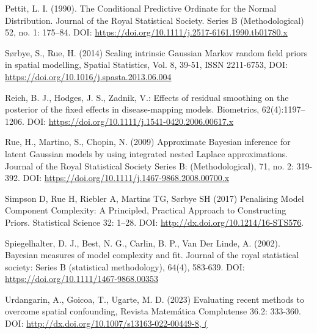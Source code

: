 \documentclass{article}
\begin{document}
\begin{thebibliography}{99}
Pettit, L. I. (1990). The Conditional Predictive Ordinate for the Normal Distribution. Journal of the Royal Statistical Society. Series B (Methodological) 52, no. 1: 175–84. DOI: \url{https://doi.org/10.1111/j.2517-6161.1990.tb01780.x}

Sørbye, S., Rue, H. (2014) Scaling intrinsic Gaussian Markov random field priors in spatial modelling, Spatial Statistics, Vol. 8, 39-51, ISSN 2211-6753, DOI: \url{https://doi.org/10.1016/j.spasta.2013.06.004}

Reich, B. J., Hodges, J. S.,  Zadnik, V.: Effects of residual smoothing on the posterior of the fixed effects in disease-mapping models. Biometrics, 62(4):1197–1206. DOI: \url{https://doi.org/10.1111/j.1541-0420.2006.00617.x}


Rue, H., Martino, S., Chopin, N. (2009)  Approximate Bayesian inference for latent Gaussian models by using integrated nested Laplace approximations. Journal of the Royal Statistical Society Series B: (Methodological), 71, no. 2: 319-392. DOI: \url{https://doi.org/10.1111/j.1467-9868.2008.00700.x}


Simpson D, Rue H, Riebler A, Martins TG, Sørbye SH (2017) Penalising Model Component Complexity: A Principled, Practical Approach to Constructing Priors. Statistical Science 32: 1–28. DOI: \url{http://dx.doi.org/10.1214/16-STS576}.

Spiegelhalter, D. J., Best, N. G., Carlin, B. P., Van Der Linde, A. (2002). Bayesian measures of model complexity and fit. Journal of the royal statistical society: Series B (statistical methodology), 64(4), 583-639. DOI: \url{https://doi.org/10.1111/1467-9868.00353}

Urdangarin, A., Goicoa, T., Ugarte, M. D. (2023) Evaluating recent methods to overcome spatial confounding, Revista Matemática Complutense 36.2: 333-360. DOI: \url{http://dx.doi.org/10.1007/s13163-022-00449-8, (}


\end{thebibliography}
\end{document}
